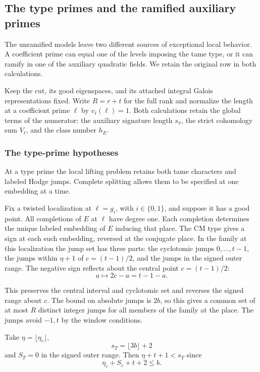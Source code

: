 \subsection{The type primes and the ramified auxiliary primes}
\label{subsec:special-prime-lengths}
\hypertarget{source-special-prime-lengths}{}

The unramified models leave two different sources of exceptional local behavior. A coefficient prime can equal one of the levels imposing the tame type, or it can ramify in one of the auxiliary quadratic fields. We retain the original row in both calculations.

Keep the cut, its good eigenspaces, and its attached
integral Galois representations fixed. Write \(R=r+t\)
for the full rank and normalize the length at a coefficient
prime \(\ell\) by \(v_\ell(\ell)=1\). Both calculations retain the global terms of the numerator: the auxiliary signature length \(s_\pi\), the strict cohomology sum \(V_\ell\), and the class number \(h_E\).

\subsubsection*{The type-prime hypotheses}

At a type prime the local lifting problem retains both tame characters and labeled Hodge jumps. Complete splitting allows them to be specified at one embedding at a time.

Fix a twisted localization at \(\ell=g_i\), with \(i\in\{0,1\}\), and suppose
it has a good point. All completions of \(E\) at \(\ell\)
have degree one. Each completion determines the unique
labeled embedding of \(E\) inducing that place. The CM
type gives a sign at each such embedding, reversed at
the conjugate place. In the family at this localization
the jump set has three parts: the cyclotomic jumps
\(0,\ldots,t-1\), the jumps within \(\eta+1\) of
\(c=(t-1)/2\), and the jumps in the signed outer range.
The negative sign reflects about the central point \(c=(t-1)/2\):
\[
 a\longmapsto 2c-a=t-1-a.
\]

This preserves the central interval and cyclotomic
set and reverses the signed range about \(c\).
The bound on absolute jumps is \(2b\), so this gives
a common set of at most \(R\) distinct integer jumps
for all members of the family at the place. The jumps
avoid \(-1,t\) by the window conditions.

Take \(\eta=\lfloor\eta_c\rfloor\),
\[
 s_T=\lfloor3b\rfloor+2
\]
and \(S_T=0\) in the signed outer range. Then
\(\eta+t+1<s_T\) since
\[
 \eta_c+S_c+t+2\le b.
\]

